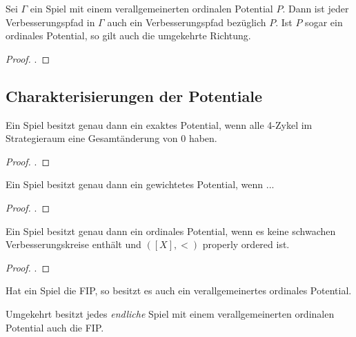 \begin{satz}
	Sei $\Gamma$ ein Spiel mit einem verallgemeinerten ordinalen Potential $P$. Dann ist jeder Verbesserungspfad in $\Gamma$ auch ein Verbesserungspfad bezüglich $P$. Ist $P$ sogar ein ordinales Potential, so gilt auch die umgekehrte Richtung.
\end{satz}

\begin{proof}.
	
\end{proof}



\subsection{Charakterisierungen der Potentiale}

\begin{satz}
	Ein Spiel besitzt genau dann ein exaktes Potential, wenn alle 4-Zykel im Strategieraum eine Gesamtänderung von $0$ haben.
\end{satz}

\begin{proof}.
	
\end{proof}

\begin{satz}
	Ein Spiel besitzt genau dann ein gewichtetes Potential, wenn ... 
\end{satz}

\begin{proof}.
	
\end{proof}

\begin{satz}
	Ein Spiel besitzt genau dann ein ordinales Potential, wenn es keine schwachen Verbesserungskreise enthält und $([X], <)$ properly ordered ist.
\end{satz}

\begin{proof}.
	
\end{proof}


\begin{satz}
	Hat ein Spiel die FIP, so besitzt es auch ein verallgemeinertes ordinales Potential.
	
	Umgekehrt besitzt jedes \emph{endliche} Spiel mit einem verallgemeinerten ordinalen Potential auch die FIP.
\end{satz}

